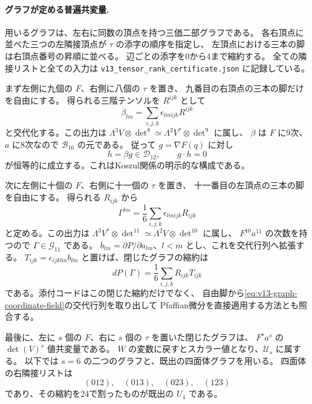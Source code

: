 \documentclass[a4paper,11pt]{ltjsarticle}
\theoremstyle{definition}
\begin{document}
\paragraph{グラフが定める普遍共変量.}
用いるグラフは、左右に同数の頂点を持つ三価二部グラフである。
各右頂点に並べた三つの左隣接頂点が $\tau$ の添字の順序を指定し、
左頂点における三本の脚は右頂点番号の昇順に並べる。
辺ごとの添字を0から4まで縮約する。
全ての隣接リストと全ての入力は
\texttt{v13\_tensor\_rank\_certificate.json} に記録している。

まず左側に九個の $F$、右側に八個の $\tau$ を置き、
九番目の右頂点の三本の脚だけを自由にする。
得られる三階テンソルを $R^{ijk}$ として
\[
 \beta_{lm}=\sum_{i,j,k}\epsilon_{lmijk}R^{ijk}
\]
と交代化する。この出力は
$\Lambda^3V\otimes\det^8\simeq\Lambda^2V^*\otimes\det^9$ に属し、
$\beta$ は $F$ に9次、$a$ に8次なので $\mathcal B_{16}$ の元である。
従って $g=\nabla F(q)$ に対し
\[
 h=\beta g\in\mathcal D_{12},\qquad g\cdot h=0
\]
が恒等的に成立する。これはKoszul関係の明示的な構成である。

次に左側に十個の $F$、右側に十一個の $\tau$ を置き、
十一番目の左頂点の三本の脚を自由にする。
得られる $R_{ijk}$ から
\begin{equation}\label{eq:v13-graph-coordinate-field}
 \Gamma^{lm}=\frac16\sum_{i,j,k}\epsilon_{lmijk}R_{ijk}
\end{equation}
と定める。この出力は
$\Lambda^3V^*\otimes\det^{11}\simeq\Lambda^2V\otimes\det^{10}$ に属し、
$F^{10}a^{11}$ の次数を持つので $\Gamma\in\mathcal G_{11}$ である。
$b_{lm}=\partial P/\partial a_{lm}$、$l<m$ とし、これを交代行列へ拡張する。
$T_{ijk}=\epsilon_{ijklm}b_{lm}$ と置けば、閉じたグラフの縮約は
\[
 dP(\Gamma)=\frac16\sum_{i,j,k}R_{ijk}T_{ijk}
\]
である。添付コードはこの閉じた縮約だけでなく、
自由脚から\eqref{eq:v13-graph-coordinate-field}の交代行列を取り出して
Pfaffian微分を直接適用する方法とも照合する。

最後に、左に $s$ 個の $F$、右に $s$ 個の $\tau$ を置いた閉じたグラフは、
$F^sa^s$ の $\det(V)^s$ 値共変量である。
$W$ の変数に戻すとスカラー値となり、$\mathcal U_s$ に属する。
以下では $s=6$ の二つのグラフと、既出の四面体グラフを用いる。
四面体の右隣接リストは
\[
 (012),\quad(013),\quad(023),\quad(123)
\]
であり、その縮約を24で割ったものが既出の $U_4$ である。
\end{document}
